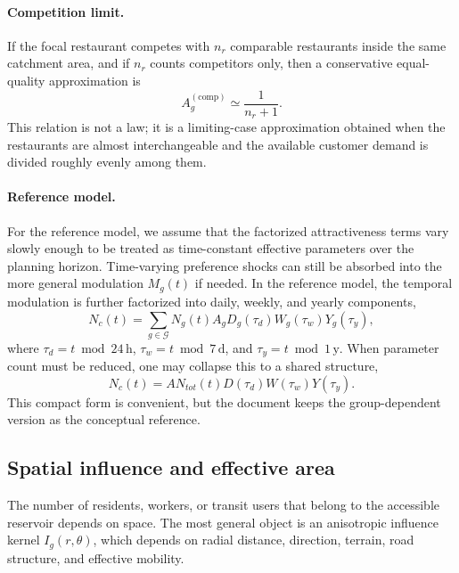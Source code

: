 \documentclass{article}
\begin{document}
\paragraph{Competition limit.}
If the focal restaurant competes with \( n_r \) comparable restaurants inside the same catchment area, and if \( n_r \) counts competitors only, then a conservative equal-quality approximation is
\begin{equation}
\label{eq:A-competition}
    A_g^{(\mathrm{comp})} \simeq \frac{1}{n_r + 1}.
\end{equation}
This relation is not a law; it is a limiting-case approximation obtained when the restaurants are almost interchangeable and the available customer demand is divided roughly evenly among them.

\paragraph{Reference model.}
For the reference model, we assume that the factorized attractiveness terms vary slowly enough to be treated as time-constant effective parameters over the planning horizon. Time-varying preference shocks can still be absorbed into the more general modulation \( M_g(t) \) if needed. In the reference model, the temporal modulation is further factorized into daily, weekly, and yearly components,
\begin{equation}
\label{eq:Nc-separable}
    N_c(t) = \sum_{g \in \mathcal{G}} N_g(t) A_g D_g(\tau_d) W_g(\tau_w) Y_g(\tau_y),
\end{equation}
where \( \tau_d = t \bmod 24\,\mathrm{h} \), \( \tau_w = t \bmod 7\,\mathrm{d} \), and \( \tau_y = t \bmod 1\,\mathrm{y} \). When parameter count must be reduced, one may collapse this to a shared structure,
\begin{equation}
\label{eq:Nc-baseline}
    N_c(t) = A N_{tot}(t) D(\tau_d) W(\tau_w) Y(\tau_y).
\end{equation}
This compact form is convenient, but the document keeps the group-dependent version as the conceptual reference.

\subsection{Spatial influence and effective area}
\label{sec:spatial}

The number of residents, workers, or transit users that belong to the accessible reservoir depends on space. The most general object is an anisotropic influence kernel \( I_g(r,\theta) \), which depends on radial distance, direction, terrain, road structure, and effective mobility.
\end{document}
